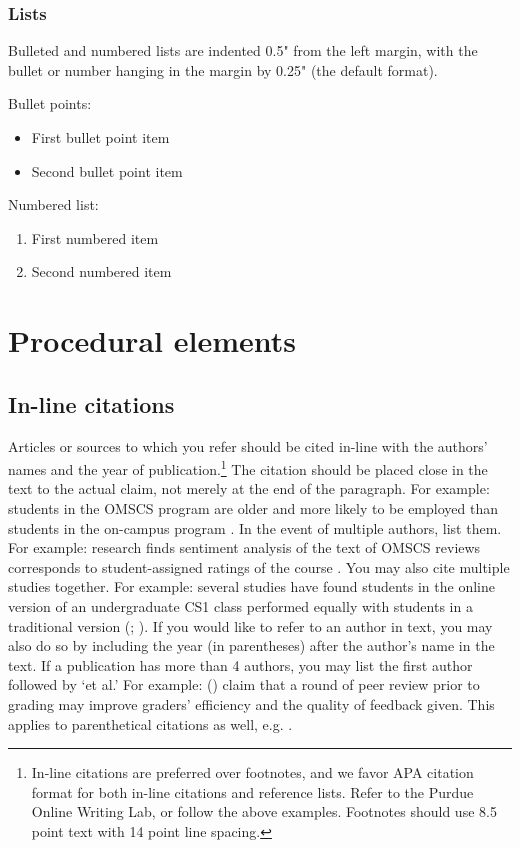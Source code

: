 \documentclass[
	letterpaper, %
]{jdf}
\begin{document}
\subsubsection{Lists}
Bulleted and numbered lists are indented 0.5" from the left margin, with the bullet or number hanging in the margin by 0.25" (the default format).

Bullet points:

\begin{itemize}
	\item First bullet point item
	\item Second bullet point item
\end{itemize}

Numbered list:

\begin{enumerate}
	\item First numbered item
	\item Second numbered item
\end{enumerate}

\section{Procedural elements}
\subsection{In-line citations}
Articles or sources to which you refer should be cited in-line with the authors’ names and the year of publication.\footnote{In-line citations are preferred over footnotes, and we favor APA citation format for both in-line citations and reference lists. Refer to the Purdue Online Writing Lab, or follow the above examples. Footnotes should use 8.5 point text with 14 point line spacing.} The citation should be placed close in the text to the actual claim, not merely at the end of the paragraph. For example: students in the OMSCS program are older and more likely to be employed than students in the on-campus program \citep{joyner2017}. In the event of multiple authors, list them. For example: research finds sentiment analysis of the text of OMSCS reviews corresponds to student-assigned ratings of the course \citep{newman2018}. You may also cite multiple studies together. For example: several studies have found students in the online version of an undergraduate CS1 class performed equally with students in a traditional version (\cite{joyner2018a}; \cite{joyner2018b}). If you would like to refer to an author in text, you may also do so by including the year (in parentheses) after the author’s name in the text. If a publication has more than 4 authors, you may list the first author followed by ‘et al.’ For example: \citeauthor{joyner2016} (\citeyear{joyner2016}) claim that a round of peer review prior to grading may improve graders’ efficiency and the quality of feedback given. This applies to parenthetical citations as well, e.g. \citep{joyner2016}.
\end{document}

